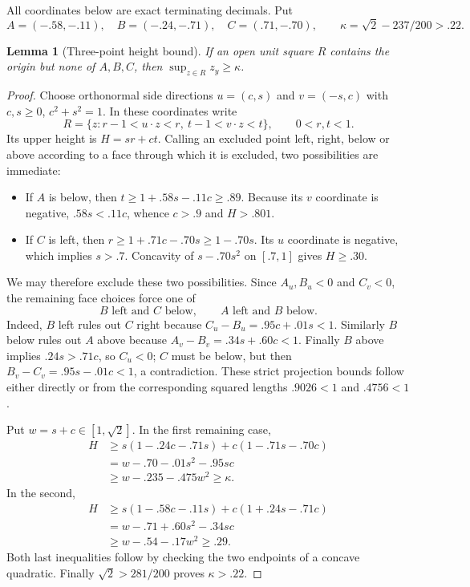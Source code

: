 \documentclass[11pt]{article}
\newtheorem{lemma}[theorem]{Lemma}
\begin{document}
All coordinates below are exact terminating decimals.
Put
\[
 A=(-.58,-.11),\quad B=(-.24,-.71),\quad C=(.71,-.70),
 \qquad \kappa=\sqrt2-237/200>.22.
\]
\begin{lemma}[Three-point height bound]\label{lem:case-zero-height}
If an open unit square $R$ contains the origin but none of $A,B,C$,
then $\sup_{z\in R}z_y\ge\kappa$.
\end{lemma}
\begin{proof}
Choose orthonormal side directions $u=(c,s)$ and $v=(-s,c)$ with
$c,s\ge0$, $c^2+s^2=1$.  In these coordinates write
\[
 R=\{z:r-1<u\cdot z<r,\ t-1<v\cdot z<t\},\qquad 0<r,t<1.
\]
Its upper height is $H=sr+ct$.  Calling an excluded point left, right,
below or above according to a face through which it is excluded, two
possibilities are immediate:
\begin{itemize}
\item If $A$ is below, then $t\ge1+.58s-.11c\ge.89$.
Because its $v$ coordinate is negative, $.58s<.11c$, whence
$c>.9$ and $H>.801$.
\item If $C$ is left, then $r\ge1+.71c-.70s\ge1-.70s$.
Its $u$ coordinate is negative, which implies $s>.7$.
Concavity of $s-.70s^2$ on $[.7,1]$ gives $H\ge.30$.
\end{itemize}
We may therefore exclude these two possibilities.  Since $A_u,B_u<0$
and $C_v<0$, the remaining face choices force one of
\[
 \text{$B$ left and $C$ below},\qquad
 \text{$A$ left and $B$ below}.
\]
Indeed, $B$ left rules out $C$ right because
$C_u-B_u=.95c+.01s<1$.  Similarly $B$ below rules out $A$ above because
$A_v-B_v=.34s+.60c<1$.  Finally $B$ above implies
$.24s>.71c$, so $C_u<0$; $C$ must be below, but then
$B_v-C_v=.95s-.01c<1$, a contradiction.  These strict projection bounds
follow either directly or from the corresponding squared lengths
$.9026<1$ and $.4756<1$.

Put $w=s+c\in[1,\sqrt2]$.  In the first remaining case,
\begin{align*}
 H&\ge s(1-.24c-.71s)+c(1-.71s-.70c)\\
  &=w-.70-.01s^2-.95sc\\
  &\ge w-.235-.475w^2\ge\kappa.
\end{align*}
In the second,
\begin{align*}
 H&\ge s(1-.58c-.11s)+c(1+.24s-.71c)\\
  &=w-.71+.60s^2-.34sc\\
  &\ge w-.54-.17w^2\ge.29.
\end{align*}
Both last inequalities follow by checking the two endpoints of a concave
quadratic.  Finally $\sqrt2>281/200$ proves $\kappa>.22$.

\end{proof}
\end{document}
